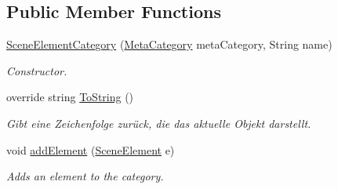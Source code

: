 \subsection*{Public Member Functions}
\begin{DoxyCompactItemize}
\item 
\hyperlink{class_a_rdev_kit_1_1_controller_1_1_editor_controller_1_1_scene_element_category_a6936cb0f458240ccf645ab384053d060}{Scene\-Element\-Category} (\hyperlink{namespace_a_rdev_kit_1_1_controller_1_1_editor_controller_a304367964b3f3f5c115bb81e7b31d534}{Meta\-Category} meta\-Category, String name)
\begin{DoxyCompactList}\small\item\em Constructor. \end{DoxyCompactList}\item 
override string \hyperlink{class_a_rdev_kit_1_1_controller_1_1_editor_controller_1_1_scene_element_category_a57ca19247962d459e91593410d925b9b}{To\-String} ()
\begin{DoxyCompactList}\small\item\em Gibt eine Zeichenfolge zurück, die das aktuelle Objekt darstellt. \end{DoxyCompactList}\item 
void \hyperlink{class_a_rdev_kit_1_1_controller_1_1_editor_controller_1_1_scene_element_category_a09c36933f68465de2c1e2427870c9fdc}{add\-Element} (\hyperlink{class_a_rdev_kit_1_1_controller_1_1_editor_controller_1_1_scene_element}{Scene\-Element} e)
\begin{DoxyCompactList}\small\item\em Adds an element to the category. \end{DoxyCompactList}\end{DoxyCompactItemize}
